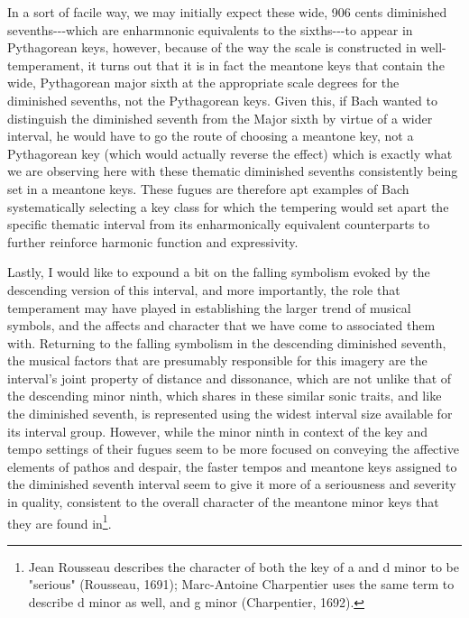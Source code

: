     \begin{center}
    \end{center}
    

    \begin{center}
    \end{center}
    
    In a sort of facile way, we may initially expect these wide, 906 cents
diminished sevenths-\/-\/-which are enharmnonic equivalents to the
sixths-\/-\/-to appear in Pythagorean keys, however, because of the way
the scale is constructed in well-temperament, it turns out that it is in
fact the meantone keys that contain the wide, Pythagorean major sixth at
the appropriate scale degrees for the diminished sevenths, not the
Pythagorean keys. Given this, if Bach wanted to distinguish the
diminished seventh from the Major sixth by virtue of a wider interval,
he would have to go the route of choosing a meantone key, not a
Pythagorean key (which would actually reverse the effect) which is
exactly what we are observing here with these thematic diminished
sevenths consistently being set in a meantone keys. These fugues are
therefore apt examples of Bach systematically selecting a key class for
which the tempering would set apart the specific thematic interval from
its enharmonically equivalent counterparts to further reinforce harmonic
function and expressivity.

Lastly, I would like to expound a bit on the falling symbolism evoked by
the descending version of this interval, and more importantly, the role
that temperament may have played in establishing the larger trend of
musical symbols, and the affects and character that we have come to
associated them with. Returning to the falling symbolism in the
descending diminished seventh, the musical factors that are presumably
responsible for this imagery are the interval's joint property of
distance and dissonance, which are not unlike that of the descending
minor ninth, which shares in these similar sonic traits, and like the
diminished seventh, is represented using the widest interval size
available for its interval group. However, while the minor ninth in
context of the key and tempo settings of their fugues seem to be more
focused on conveying the affective elements of pathos and despair, the
faster tempos and meantone keys assigned to the diminished seventh
interval seem to give it more of a seriousness and severity in quality,
consistent to the overall character of the meantone minor keys that they
are found
in\footnote{Jean Rousseau describes the character of both the key of a and d minor to be "serious" (Rousseau, 1691); Marc-Antoine Charpentier uses the same term to describe d minor as well, and g minor (Charpentier, 1692).}.

